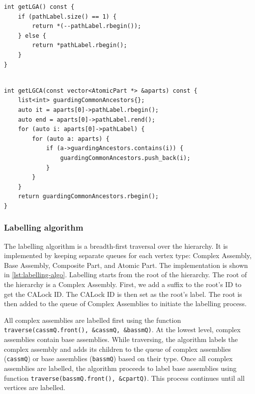 \begin{lstlisting}[caption={Finding LGA using path label}, label={lst:findLGA}]
int getLGA() const {
    if (pathLabel.size() == 1) {
        return *(--pathLabel.rbegin());
    } else {
        return *pathLabel.rbegin();
    }
}
\end{lstlisting}


\begin{lstlisting}[caption={Finging the LGCA of a set of atomic parts}, label={lst:findLGCA}]

int getLGCA(const vector<AtomicPart *> &aparts) const {
    list<int> guardingCommonAncestors{};
    auto it = aparts[0]->pathLabel.rbegin();
    auto end = aparts[0]->pathLabel.rend();
    for (auto i: aparts[0]->pathLabel) {
        for (auto a: aparts) {
            if (a->guardingAncestors.contains(i)) {
                guardingCommonAncestors.push_back(i);
            }
        }
    }
    return guardingCommonAncestors.rbegin();
}

\end{lstlisting}


\subsubsection{Labelling algorithm}

The labelling algorithm is a breadth-first traversal over the hierarchy. It is implemented by keeping separate queues for each vertex type: Complex Assembly, Base Assembly, Composite Part, and Atomic Part. The implementation is shown in \cref{lst:labelling-algo}.
Labelling starts from the root of the hierarchy. The root of the hierarchy is a Complex Assembly. First, we add a suffix to the root's ID to get the CALock ID. The CALock ID is then set as the root's label. The root is then added to the queue of Complex Assemblies to initiate the labelling process. 

All complex assemblies are labelled first using the function \texttt{traverse(cassmQ.front(), \&cassmQ, \&bassmQ)}. At the lowest level, complex assemblies contain base assemblies. While traversing, the algorithm labels the complex assembly and adds its children to the queue of complex assemblies (\texttt{cassmQ}) or base assemblies (\texttt{bassmQ}) based on their type. Once all complex assemblies are labelled, the algorithm proceeds to label base assemblies using function \texttt{traverse(bassmQ.front(), \&cpartQ)}. This process continues until all vertices are labelled.


